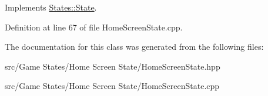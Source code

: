 \begin{DoxyVerb}\end{DoxyVerb}
 

Implements \mbox{\hyperlink{class_states_1_1_state_ab8e935def8138e0b917c3228a29904e4}{States\+::\+State}}.



Definition at line 67 of file Home\+Screen\+State.\+cpp.


\begin{DoxyCode}{0}

\end{DoxyCode}


The documentation for this class was generated from the following files\+:\begin{DoxyCompactItemize}
\item 
src/\+Game States/\+Home Screen State/Home\+Screen\+State.\+hpp\item 
src/\+Game States/\+Home Screen State/Home\+Screen\+State.\+cpp\end{DoxyCompactItemize}
